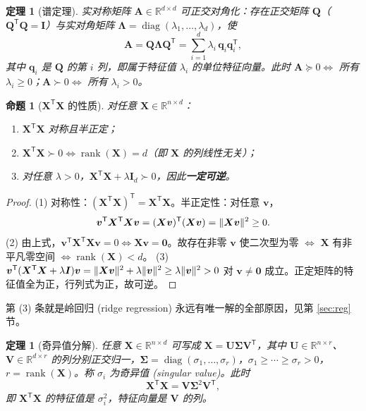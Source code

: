 \documentclass[UTF8,a4paper,11pt]{ctexart}
\theoremstyle{definition}
\theoremstyle{plain}
\newtheorem{theorem}[definition]{定理}
\newtheorem{proposition}[definition]{命题}
\theoremstyle{remark}
\DeclarePairedDelimiter{\norm}{\lVert}{\rVert}
\DeclareMathOperator{\rank}{rank}
\DeclareMathOperator{\diag}{diag}
\newcommand{\R}{\mathbb{R}}
\newcommand{\T}{^{\mathsf{T}}}
\newcommand{\eng}[1]{\textup{(#1)}}
\begin{document}
\begin{theorem}[谱定理]\label{thm:spectral}
实对称矩阵 $\bm{A}\in\R^{d\times d}$ 可正交对角化：存在正交矩阵 $\bm{Q}$（$\bm{Q}\T\bm{Q}=\bm{I}$）与实对角矩阵 $\bm{\Lambda}=\diag(\lambda_1,\dots,\lambda_d)$，使
\[
  \bm{A}=\bm{Q}\bm{\Lambda}\bm{Q}\T=\sum_{i=1}^{d}\lambda_i\,\bm{q}_i\bm{q}_i\T,
\]
其中 $\bm{q}_i$ 是 $\bm{Q}$ 的第 $i$ 列，即属于特征值 $\lambda_i$ 的单位特征向量。此时 $\bm{A}\succeq0\iff$ 所有 $\lambda_i\ge0$；$\bm{A}\succ0\iff$ 所有 $\lambda_i>0$。
\end{theorem}

\begin{proposition}[$\bm{X}\T\bm{X}$ 的性质]\label{prop:xtx}
对任意 $\bm{X}\in\R^{n\times d}$：
\begin{enumerate}[label=(\arabic*)]
  \item $\bm{X}\T\bm{X}$ 对称且半正定；
  \item $\bm{X}\T\bm{X}\succ0\iff\rank(\bm{X})=d$（即 $\bm{X}$ 的列线性无关）；
  \item 对任意 $\lambda>0$，$\bm{X}\T\bm{X}+\lambda\bm{I}_d\succ0$，因此\textbf{一定可逆}。
\end{enumerate}
\end{proposition}

\begin{proof}
(1) 对称性：$(\bm{X}\T\bm{X})\T=\bm{X}\T\bm{X}$。半正定性：对任意 $\bm{v}$，
\[
  \bm{v}\T\bm{X}\T\bm{X}\bm{v}=(\bm{X}\bm{v})\T(\bm{X}\bm{v})=\norm{\bm{X}\bm{v}}^2\ge0 .
\]
(2) 由上式，$\bm{v}\T\bm{X}\T\bm{X}\bm{v}=0\iff\bm{X}\bm{v}=\bm{0}$。故存在非零 $\bm{v}$ 使二次型为零 $\iff$ $\bm{X}$ 有非平凡零空间 $\iff\rank(\bm{X})<d$。
(3) $\bm{v}\T(\bm{X}\T\bm{X}+\lambda\bm{I})\bm{v}=\norm{\bm{X}\bm{v}}^2+\lambda\norm{\bm{v}}^2\ge\lambda\norm{\bm{v}}^2>0$ 对 $\bm{v}\ne\bm{0}$ 成立。正定矩阵的特征值全为正，行列式为正，故可逆。
\end{proof}

第 (3) 条就是岭回归 \eng{ridge regression} 永远有唯一解的全部原因，见第 \ref{sec:reg} 节。

\begin{theorem}[奇异值分解]\label{thm:svd}
任意 $\bm{X}\in\R^{n\times d}$ 可写成 $\bm{X}=\bm{U}\bm{\Sigma}\bm{V}\T$，其中 $\bm{U}\in\R^{n\times r}$、$\bm{V}\in\R^{d\times r}$ 的列分别正交归一，$\bm{\Sigma}=\diag(\sigma_1,\dots,\sigma_r)$，$\sigma_1\ge\cdots\ge\sigma_r>0$，$r=\rank(\bm{X})$。称 $\sigma_i$ 为奇异值 \eng{singular value}。此时
\[
  \bm{X}\T\bm{X}=\bm{V}\bm{\Sigma}^2\bm{V}\T ,
\]
即 $\bm{X}\T\bm{X}$ 的特征值是 $\sigma_i^2$，特征向量是 $\bm{V}$ 的列。
\end{theorem}
\end{document}
